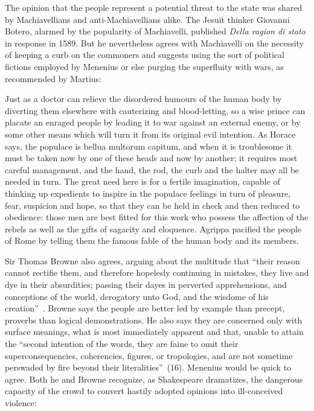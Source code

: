 The opinion that the people represent a potential threat to the state was shared by Machiavellians and anti-Machiavellians alike.
The Jesuit thinker Giovanni Botero, alarmed by the popularity of Machiavelli, published \emph{Della ragion di stato} in  response in 1589.
But he nevertheless agrees with Machiavelli on the necessity of keeping a curb on the commoners and suggests using the sort of political fictions employed by Menenius or else purging the superfluity with wars, as recommended by Martius:
\begin{bq}
Just as a doctor can relieve the disordered humours of the human body by diverting them elsewhere with cauterizing and blood-letting, so a wise prince can placate an enraged people by leading it to war against an external enemy, or by some other means which will turn it from its original evil intention.
As Horace says, the populace is bellua multorum capitum, and when it is troublesome it must be taken now by one of these heads and now by another; it requires most careful management, and the hand, the rod, the curb and the halter may all be needed in turn.
The great need here is for a fertile imagination, capable of thinking up expedients to inspire in the populace feelings in turn of pleasure, fear, suspicion and hope, so that they can be held in check and then reduced to obedience: those men are best fitted for this work who possess the affection of the rebels as well as the gifts of sagacity and eloquence.
Agrippa pacified the people of Rome by telling them the famous fable of the human body and its members.~\cite[112--113]{botero_reason_1956}
\end{bq}
Sir Thomas Browne also agrees, arguing about the multitude that ``their reason cannot rectifie them, and therefore hopelesly continuing in mistakes, they live and dye in their absurdities; passing their dayes in perverted apprehensions, and conceptions of the world, derogatory unto God, and the wisdome of his creation''~\cite[14]{browne_sir_1981}.
Browne says the people are better led by example than precept, proverbs than logical demonstrations.
He also says they are concerned only with surface meanings, what is most immediately apparent and that, unable to attain the ``second intention of the words, they are faine to omit their superconsequencies, coherencies, figures, or tropologies, and are not sometime perswaded by fire beyond their literalities''~(16).
Menenius would be quick to agree.
Both he and Browne recognize, as Shakespeare dramatizes, the dangerous capacity of the crowd to convert hastily adopted opinions into ill-conceived violence:
